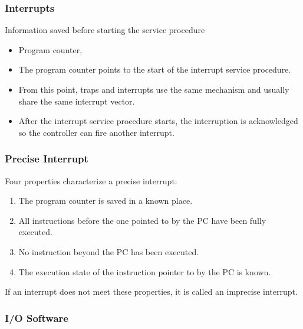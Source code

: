 \begin{frame}
  \frametitle{Interrupts}
  \begin{block}{Information saved before starting the service procedure}
    \begin{itemize}
      \item Program counter,
      \item The program counter points to the start of the interrupt service procedure.
      \item From this point, traps and interrupts use the same mechanism and usually share the same interrupt vector.
      \item After the interrupt service procedure starts, the interruption is acknowledged so the controller can fire another interrupt.
    \end{itemize}
  \end{block}
\end{frame}

\begin{frame}
  \frametitle{Precise Interrupt}
  Four properties characterize a precise interrupt:
  \begin{enumerate}
    \item The program counter is saved in a known place.
    \item All instructions before the one pointed to by the PC have been fully executed.
    \item No instruction beyond the PC has been executed.
    \item The execution state of the instruction pointer to by the PC is known.
  \end{enumerate}
  If an interrupt does not meet these properties, it is called an imprecise interrupt.
\end{frame}

\begin{frame}
  \frametitle{I/O Software}
\end{frame}
